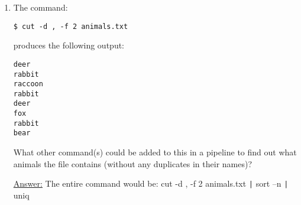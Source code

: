 \documentclass[12pt]{article}
\begin{document}
\begin{enumerate}
\item The command:
\begin{flushleft}
\texttt{\$ cut -d , -f 2 animals.txt}
\end{flushleft}
produces the following output:
\begin{flushleft}
\texttt{deer \\ rabbit \\ raccoon \\ rabbit \\ deer \\ fox \\ rabbit \\ bear}
\end{flushleft}
What other command(s) could be added to this in a pipeline to find out what animals the file contains (without any duplicates in their names)?
\begin{center}
\textsf{\underline{Answer:} The entire command would be: cut -d , -f 2 animals.txt} \texttt{|} \textsf{sort –n} \texttt{|} \textsf{uniq}
\end{center}
\end{enumerate}
\end{document}

